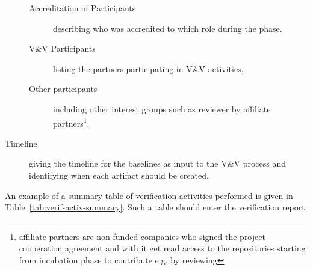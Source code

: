 \begin{description}
\begin{description}
\item[Accreditation of Participants] describing who was accredited to
  which role during the \VV phase. 
\item[V\&V Participants] listing the partners participating in V\&V activities,
\item[Other participants] including other interest groups such as
  reviewer by affiliate partners\footnote{affiliate partners are
    non-funded companies who signed the project cooperation agreement
    and with it get read access to the repositories starting from
    incubation phase to contribute e.g. by reviewing}. 
\end{description}

\item[Timeline] giving the timeline for the baselines as input to the
  V\&V process and identifying when each artifact should be created. 
\end{description}



An example of a summary table of verification activities performed is
given in Table~\ref{tab:verif-activ-summary}.  Such a table should
enter the verification report.

